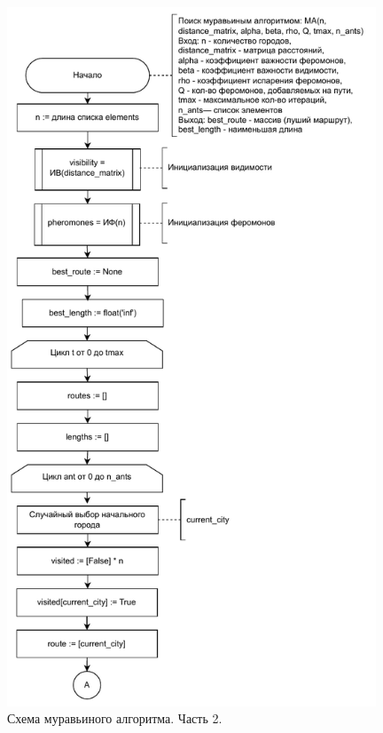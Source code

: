 \begin{figure}[H]
    \centering
    \includegraphics[width=110mm]{images/ant_1}
    \caption{Схема муравьиного алгоритма. Часть 2.}
    \label{images:ant_1}
\end{figure}

